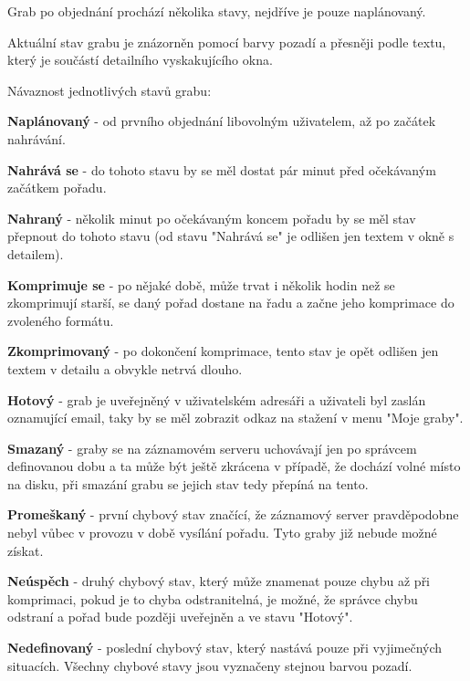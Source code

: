 \vspace{10pt}

Grab po objednání prochází několika stavy, nejdříve je pouze naplánovaný.

Aktuální stav grabu je znázorněn pomocí barvy pozadí a přesněji podle textu, který je součástí detailního vyskakujícího okna.

\vspace{10pt}

Návaznost jednotlivých stavů grabu:

\vspace{10pt}

\textbf{Naplánovaný} - od prvního objednání libovolným uživatelem, až po začátek nahrávání.

\textbf{Nahrává se} - do tohoto stavu by se měl dostat pár minut před očekávaným začátkem pořadu.

\textbf{Nahraný} - několik minut po očekávaným koncem pořadu by se měl stav přepnout do tohoto stavu (od stavu "Nahrává se" je odlišen jen textem v okně s detailem).

\textbf{Komprimuje se} - po nějaké době, může trvat i několik hodin než se zkomprimují starší, se daný pořad dostane na řadu a začne jeho komprimace do zvoleného formátu.

\textbf{Zkomprimovaný} - po dokončení komprimace, tento stav je opět odlišen jen textem v detailu a obvykle netrvá dlouho.

\textbf{Hotový} - grab je uveřejněný v uživatelském adresáři a uživateli byl zaslán oznamující email, taky by se měl zobrazit odkaz na stažení v menu "Moje graby".

\textbf{Smazaný} - graby se na záznamovém serveru uchovávají jen po správcem definovanou dobu a ta může být ještě zkrácena v případě, že dochází volné místo na disku, při smazání grabu se jejich stav tedy přepíná na tento.

\textbf{Promeškaný} - první chybový stav značící, že záznamový server pravděpodobne nebyl vůbec v provozu v době vysílání pořadu. Tyto graby již nebude možné získat.

\textbf{Neúspěch} - druhý chybový stav, který může znamenat pouze chybu až při komprimaci, pokud je to chyba odstranitelná, je možné, že správce chybu odstraní a pořad bude později uveřejněn a ve stavu "Hotový".

\textbf{Nedefinovaný} - poslední chybový stav, který nastává pouze při vyjimečných situacích. Všechny chybové stavy jsou vyznačeny stejnou barvou pozadí.

